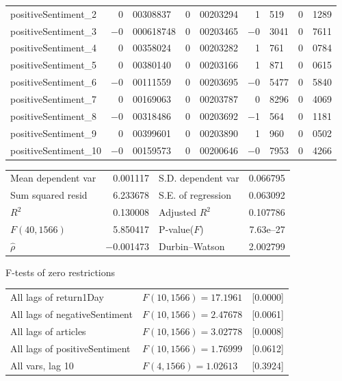 \begin{center}
\begin{longtable}{lr@{.}lr@{.}lr@{.}lr@{.}l}
positiveSentiment\_2 &
    0&00308837 &
    0&00203294 &
        1&519 &
        0&1289 \\
positiveSentiment\_3 &
    $-$0&000618748 &
    0&00203465 &
        $-$0&3041 &
        0&7611 \\
positiveSentiment\_4 &
    0&00358024 &
    0&00203282 &
        1&761 &
        0&0784 \\
positiveSentiment\_5 &
    0&00380140 &
    0&00203166 &
        1&871 &
        0&0615 \\
positiveSentiment\_6 &
    $-$0&00111559 &
    0&00203695 &
        $-$0&5477 &
        0&5840 \\
positiveSentiment\_7 &
    0&00169063 &
    0&00203787 &
        0&8296 &
        0&4069 \\
positiveSentiment\_8 &
    $-$0&00318486 &
    0&00203692 &
        $-$1&564 &
        0&1181 \\
positiveSentiment\_9 &
    0&00399601 &
    0&00203890 &
        1&960 &
        0&0502 \\
positiveSentiment\_10 &
    $-$0&00159573 &
    0&00200646 &
        $-$0&7953 &
        0&4266 \\
\end{longtable}

\begin{tabular}{lrlr}
Mean dependent var &  0.001117 & S.D. dependent var &  0.066795 \\
Sum squared resid &  6.233678 & S.E. of regression &  0.063092 \\
$R^2$ &  0.130008 & Adjusted $R^2$ &  0.107786 \\
$F(40, 1566)$ &  5.850417 & P-value($F$) &  7.63\textrm{e--27} \\
$\hat{\rho}$ & $-$0.001473 & Durbin--Watson &  2.002799 \\
\end{tabular}

\end{center}

\begin{center}
F-tests of zero restrictions\\[1em]
\begin{tabular}{lll}
All lags of return1Day & $F(10, 1566) = 17.1961$ & [0.0000]\\
All lags of negativeSentiment & $F(10, 1566) = 2.47678$ & [0.0061]\\
All lags of articles & $F(10, 1566) = 3.02778$ & [0.0008]\\
All lags of positiveSentiment & $F(10, 1566) = 1.76999$ & [0.0612]\\
All vars, lag 10 & $F(4, 1566) = 1.02613$ & [0.3924]\\
\end{tabular}
\end{center}

